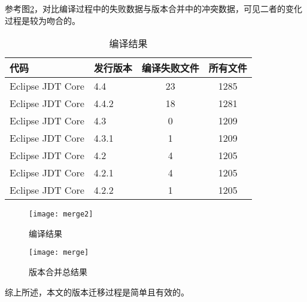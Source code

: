 参考图\ref {data_merge_compile}，对比编译过程中的失败数据与版本合并中的冲突数据，可见二者的变化过程是较为吻合的。

\begin{table}[H]
	\caption{编译结果}
	\label{data_git_merge2}
	\centering
	\begin{tabular}{llcc}
		\toprule[1.5pt]
		{\heiti 代码} & {\heiti 发行版本} & {\heiti 编译失败文件} & {\heiti 所有文件}\\\midrule[1pt]
		Eclipse JDT Core & 4.4 & 23 & 1285\\
		Eclipse JDT Core & 4.4.2 & 18 & 1281\\
		Eclipse JDT Core & 4.3 & 0 & 1209\\
		Eclipse JDT Core & 4.3.1 & 1 & 1209\\
		Eclipse JDT Core & 4.2 & 4 & 1205\\
		Eclipse JDT Core & 4.2.1 & 4 & 1205\\
		Eclipse JDT Core & 4.2.2 & 1 & 1205\\
		\bottomrule[1.5pt]
	\end{tabular}
\end{table}

\begin{figure}[H]
	\centering
	\texttt{[image: merge2]}
	\caption {编译结果}
	\label {data_compile}	
\end{figure}

\begin{figure}[H]
	\centering
	\texttt{[image: merge]}
	\caption {版本合并总结果}
	\label {data_merge_compile}	
\end{figure}



综上所述，本文的版本迁移过程是简单且有效的。

%
%

